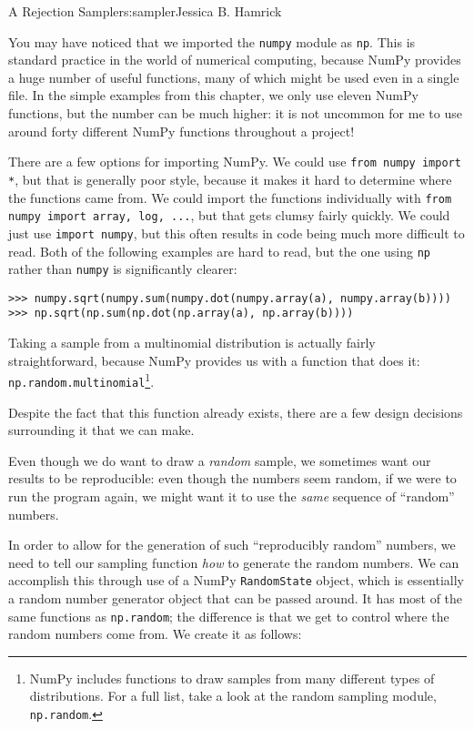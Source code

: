 \begin{aosachapter}{A Rejection Sampler}{s:sampler}{Jessica B. Hamrick}
\label{importing-numpy}

You may have noticed that we imported the \texttt{numpy} module as
\texttt{np}. This is standard practice in the world of numerical
computing, because NumPy provides a huge number of useful functions,
many of which might be used even in a single file. In the simple
examples from this chapter, we only use eleven NumPy functions, but the
number can be much higher: it is not uncommon for me to use around forty
different NumPy functions throughout a project!

There are a few options for importing NumPy. We could use
\texttt{from numpy import *}, but that is generally poor style, because
it makes it hard to determine where the functions came from. We could
import the functions individually with
\texttt{from numpy import array, log, ...}, but that gets clumsy fairly
quickly. We could just use \texttt{import numpy}, but this often results
in code being much more difficult to read. Both of the following
examples are hard to read, but the one using \texttt{np} rather than
\texttt{numpy} is significantly clearer:

\begin{verbatim}
>>> numpy.sqrt(numpy.sum(numpy.dot(numpy.array(a), numpy.array(b))))
>>> np.sqrt(np.sum(np.dot(np.array(a), np.array(b))))
\end{verbatim}

\label{sampling-from-a-multinomial-distribution}

Taking a sample from a multinomial distribution is actually fairly
straightforward, because NumPy provides us with a function that does it:
\texttt{np.random.multinomial}\footnote{NumPy includes functions to draw
  samples from many different types of distributions. For a full list,
  take a look at the random sampling module, \texttt{np.random}.}.

Despite the fact that this function already exists, there are a few
design decisions surrounding it that we can make.

\label{seeding-the-random-number-generator}

Even though we do want to draw a \emph{random} sample, we sometimes want
our results to be reproducible: even though the numbers seem random, if
we were to run the program again, we might want it to use the
\emph{same} sequence of ``random'' numbers.

In order to allow for the generation of such ``reproducibly random''
numbers, we need to tell our sampling function \emph{how} to generate
the random numbers. We can accomplish this through use of a NumPy
\texttt{RandomState} object, which is essentially a random number
generator object that can be passed around. It has most of the same
functions as \texttt{np.random}; the difference is that we get to
control where the random numbers come from. We create it as follows:


\end{aosachapter}
